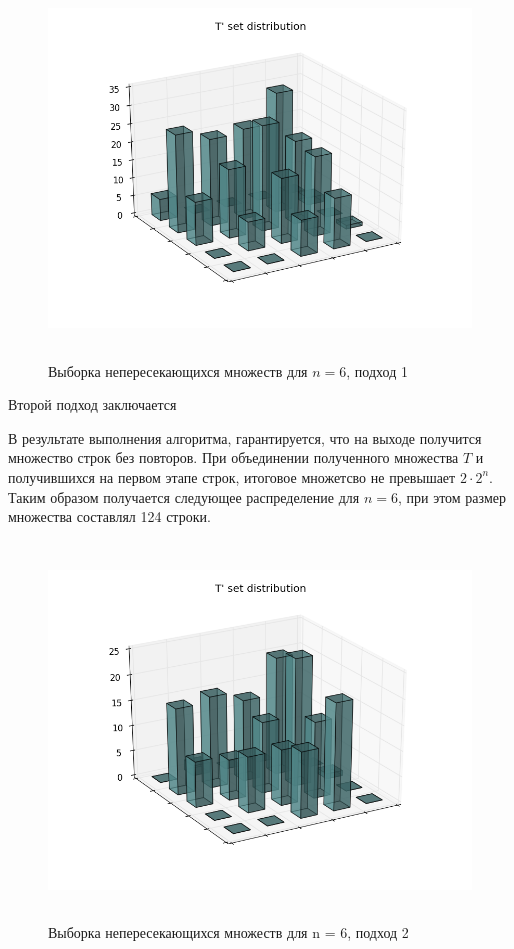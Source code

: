 \begin{figure}[H]
\centering
\includegraphics[height=10cm]{pic/fig6_mod2.png}
\caption{Выборка непересекающихся множеств для $n = 6$, подход 1}\label{fig2}
\end{figure}

Второй подход заключается

В результате выполнения алгоритма, гарантируется, что на выходе получится множество строк без повторов. 
При объединении полученного множества $T$ и получившихся на первом этапе строк, итоговое множетсво не превышает $2\cdot2^n$. 
Таким образом получается следующее распределение для $n = 6$, при этом размер множества составлял 124 строки. 

\begin{figure}[H]
\centering
\includegraphics[height=10cm]{pic/fig6_mod3.png}
\caption{Выборка непересекающихся множеств для n = 6, подход 2}\label{fig2}
\end{figure}

